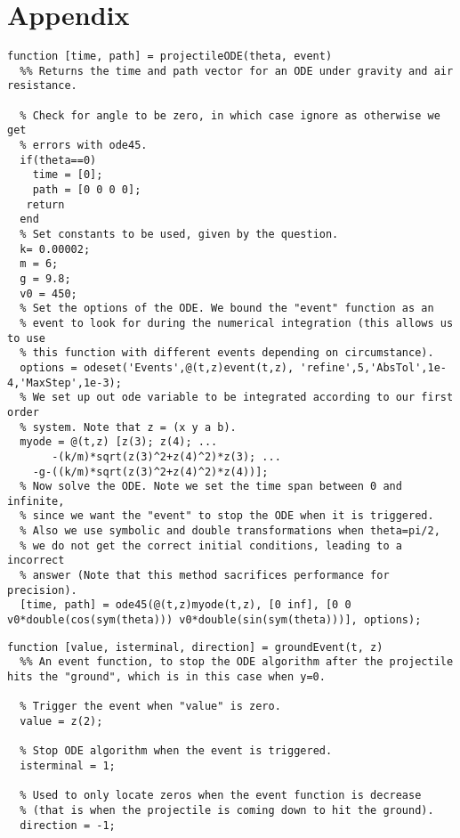 \documentclass[12pt]{article}
\begin{document}
\section*{Appendix}
\begin{lstlisting}[caption={projectileODE function},label={1_projectileODE}]
  function [time, path] = projectileODE(theta, event)
  %% Returns the time and path vector for an ODE under gravity and air resistance.

  % Check for angle to be zero, in which case ignore as otherwise we get
  % errors with ode45.
  if(theta==0)
    time = [0];
    path = [0 0 0 0];
   return
  end
  % Set constants to be used, given by the question.
  k= 0.00002;
  m = 6;
  g = 9.8;
  v0 = 450;
  % Set the options of the ODE. We bound the "event" function as an
  % event to look for during the numerical integration (this allows us to use
  % this function with different events depending on circumstance).
  options = odeset('Events',@(t,z)event(t,z), 'refine',5,'AbsTol',1e-4,'MaxStep',1e-3);
  % We set up out ode variable to be integrated according to our first order
  % system. Note that z = (x y a b).
  myode = @(t,z) [z(3); z(4); ...
       -(k/m)*sqrt(z(3)^2+z(4)^2)*z(3); ...
    -g-((k/m)*sqrt(z(3)^2+z(4)^2)*z(4))];
  % Now solve the ODE. Note we set the time span between 0 and infinite,
  % since we want the "event" to stop the ODE when it is triggered.
  % Also we use symbolic and double transformations when theta=pi/2,
  % we do not get the correct initial conditions, leading to a incorrect
  % answer (Note that this method sacrifices performance for precision).
  [time, path] = ode45(@(t,z)myode(t,z), [0 inf], [0 0 v0*double(cos(sym(theta))) v0*double(sin(sym(theta)))], options);
\end{lstlisting}

\begin{lstlisting}[caption={groundEvent function}, label={1_groundEvent}]
  function [value, isterminal, direction] = groundEvent(t, z)
  %% An event function, to stop the ODE algorithm after the projectile hits the "ground", which is in this case when y=0.

  % Trigger the event when "value" is zero.
  value = z(2);

  % Stop ODE algorithm when the event is triggered.
  isterminal = 1;

  % Used to only locate zeros when the event function is decrease
  % (that is when the projectile is coming down to hit the ground).
  direction = -1;
\end{lstlisting}
\end{document}
